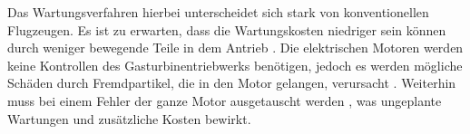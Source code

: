 



Das Wartungsverfahren hierbei unterscheidet sich stark von konventionellen Flugzeugen. 
Es ist zu erwarten, dass die Wartungskosten niedriger sein können durch weniger bewegende Teile in dem Antrieb \cite{dalmia2022powering}. 
%
Die elektrischen Motoren werden keine Kontrollen des Gasturbinentriebwerks benötigen, %
jedoch es werden mögliche Schäden 
durch Fremdpartikel, die in den Motor gelangen, verursacht \cite{reimers2018introduction}.
Weiterhin muss bei einem Fehler der ganze Motor ausgetauscht werden \cite{dalmia2022powering}, 
was ungeplante Wartungen und zusätzliche Kosten bewirkt.

